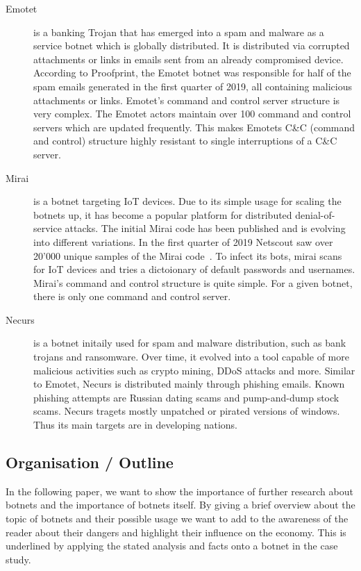 \begin{description}

\item[Emotet] is a banking Trojan that has emerged into a spam and malware as a service botnet which is globally distributed.
It is distributed via corrupted attachments or links in emails sent from an already compromised device.
According to Proofprint, the Emotet botnet was responsible for half of the spam emails generated in the first quarter of 2019, all containing malicious attachments or links.
Emotet's command and control server structure is very complex.
The Emotet actors maintain over 100 command and control servers which are updated frequently.
This makes Emotets C\&C (command and control) structure highly resistant to single interruptions of a C\&C server.\cite{CenturyLink19}

\item[Mirai] is a botnet targeting IoT devices.
Due to its simple usage for scaling the botnets up, it has become a popular platform for distributed denial-of-service attacks.
The initial Mirai code has been published and is evolving into different variations.
In the first quarter of 2019 Netscout saw over 20'000 unique samples of the Mirai code~\cite{Netscout19}.
To infect its bots, mirai scans for IoT devices and tries a dictoionary of default passwords and usernames.
Mirai's command and control structure is quite simple.
For a given botnet, there is only one command and control server.\cite{CenturyLink19}

\item[Necurs] is a botnet initaily used for spam and malware distribution, such as bank trojans and ransomware.
Over time, it evolved into a tool capable of more malicious activities such as crypto mining, DDoS attacks and more.
Similar to Emotet, Necurs is distributed mainly through phishing emails.
Known phishing attempts are Russian dating scams and pump-and-dump stock scams.
Necurs tragets mostly unpatched or pirated versions of windows.
Thus its main targets are in developing nations.\cite{CenturyLink19}

\end{description}




\subsection{Organisation / Outline}
In the following paper, we want to show the importance of further research about botnets and the importance of botnets itself. By giving a brief overview about the topic of botnets and their possible usage we want to add to the awareness of the reader about their dangers and highlight their influence on the economy. This is underlined by applying the stated analysis and facts onto a botnet in the case study.


